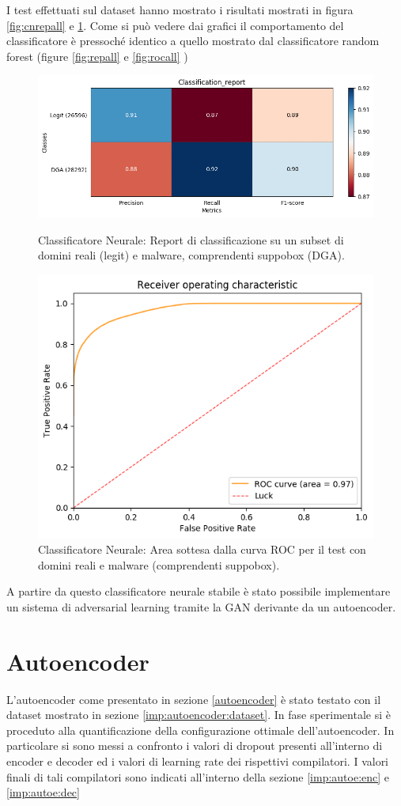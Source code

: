 I test effettuati sul dataset hanno mostrato i risultati mostrati in figura \ref{fig:cnrepall} e \ref{fig:cnrocall}. Come si può vedere dai grafici il comportamento del classificatore è pressoché identico a quello mostrato dal classificatore random forest (figure \ref{fig:repall} e \ref{fig:rocall} )

\begin{figure}[!bp]
    \centering
    \includegraphics[width=.85\columnwidth]{figures/clas_nn/class_rep.png}
    \caption{Classificatore Neurale: Report di classificazione su un subset di domini reali (legit) e malware, comprendenti suppobox (DGA).\label{fig:cnrepall}}

    \centering
    \includegraphics[width=.85\columnwidth]{figures/clas_nn/roc_plot.png}
    \caption{Classificatore Neurale: Area sottesa dalla curva ROC per il test con domini reali e malware (comprendenti suppobox).\label{fig:cnrocall}}
\end{figure}

A partire da questo classificatore neurale stabile è stato possibile implementare un sistema di adversarial learning tramite la GAN derivante da un autoencoder. 

\newpage
\section{Autoencoder}
\label{ris:autoenc}
L'autoencoder come presentato in sezione \ref{autoencoder} è stato testato con il dataset mostrato in sezione \ref{imp:autoencoder:dataset}. In fase sperimentale si è proceduto alla quantificazione della configurazione ottimale dell'autoencoder. In particolare si sono messi a confronto i valori di dropout presenti all'interno di encoder e decoder ed i valori di learning rate dei rispettivi compilatori. I valori finali di tali compilatori sono indicati all'interno della sezione \ref{imp:autoe:enc} e \ref{imp:autoe:dec}

